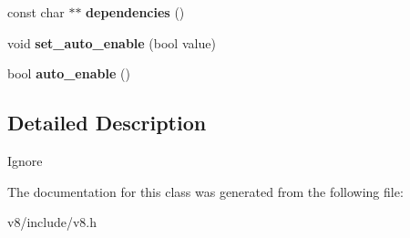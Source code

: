 \begin{DoxyCompactItemize}
\item 
const char $\ast$$\ast$ {\bfseries dependencies} ()\hypertarget{classv8_1_1Extension_adbec8a811d5a4554678da4a5d55dda6d}{}\label{classv8_1_1Extension_adbec8a811d5a4554678da4a5d55dda6d}

\item 
void {\bfseries set\+\_\+auto\+\_\+enable} (bool value)\hypertarget{classv8_1_1Extension_af5b752ba211315b6e9dac5c0e6e638e8}{}\label{classv8_1_1Extension_af5b752ba211315b6e9dac5c0e6e638e8}

\item 
bool {\bfseries auto\+\_\+enable} ()\hypertarget{classv8_1_1Extension_aee87ef4f9c3d7880fc3b28765d28e516}{}\label{classv8_1_1Extension_aee87ef4f9c3d7880fc3b28765d28e516}

\end{DoxyCompactItemize}


\subsection{Detailed Description}
Ignore 

The documentation for this class was generated from the following file\+:\begin{DoxyCompactItemize}
\item 
v8/include/v8.\+h\end{DoxyCompactItemize}
